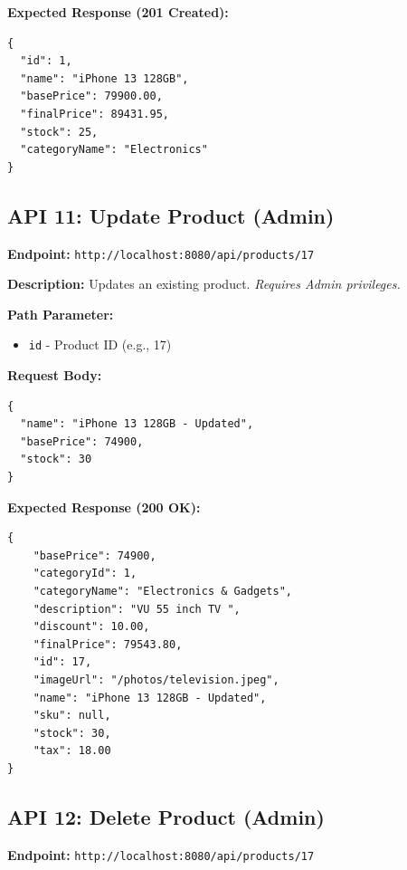 \documentclass[12pt, a4paper]{article}
\begin{document}
\textbf{Expected Response (201 Created):}
\begin{lstlisting}
{
  "id": 1,
  "name": "iPhone 13 128GB",
  "basePrice": 79900.00,
  "finalPrice": 89431.95,
  "stock": 25,
  "categoryName": "Electronics"
}
\end{lstlisting}

\vspace{0.5cm}

\subsection{API 11: Update Product (Admin)}

\begin{tcolorbox}[colback=putcolor!10, colframe=putcolor, title=PUT]
\textbf{Endpoint:} \texttt{http://localhost:8080/api/products/17}
\end{tcolorbox}

\textbf{Description:} Updates an existing product. \textit{Requires Admin privileges.}

\textbf{Path Parameter:}
\begin{itemize}
    \item \texttt{id} - Product ID (e.g., 17)
\end{itemize}

\textbf{Request Body:}
\begin{lstlisting}
{
  "name": "iPhone 13 128GB - Updated",
  "basePrice": 74900,
  "stock": 30
}
\end{lstlisting}

\textbf{Expected Response (200 OK):}
\begin{lstlisting}
{
    "basePrice": 74900,
    "categoryId": 1,
    "categoryName": "Electronics & Gadgets",
    "description": "VU 55 inch TV ",
    "discount": 10.00,
    "finalPrice": 79543.80,
    "id": 17,
    "imageUrl": "/photos/television.jpeg",
    "name": "iPhone 13 128GB - Updated",
    "sku": null,
    "stock": 30,
    "tax": 18.00
}
\end{lstlisting}

\vspace{0.5cm}

\subsection{API 12: Delete Product (Admin)}

\begin{tcolorbox}[colback=deletecolor!10, colframe=deletecolor, title=DELETE]
\textbf{Endpoint:} \texttt{http://localhost:8080/api/products/17}
\end{tcolorbox}
\end{document}

